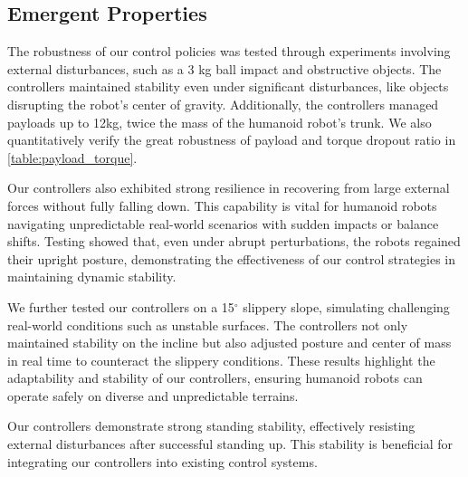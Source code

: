 \subsection{Emergent Properties} 


 The robustness of our control policies was tested through experiments involving external disturbances, such as a 3 kg ball impact and obstructive objects. The controllers maintained stability even under significant disturbances, like objects disrupting the robot's center of gravity. Additionally, the controllers managed payloads up to 12kg, twice the mass of the humanoid robot's trunk. We also quantitatively verify the great robustness of payload and torque dropout ratio in \cref{table:payload_torque}.  

 Our controllers also exhibited strong resilience in recovering from large external forces without fully falling down. This capability is vital for humanoid robots navigating unpredictable real-world scenarios with sudden impacts or balance shifts. Testing showed that, even under abrupt perturbations, the robots regained their upright posture, demonstrating the effectiveness of our control strategies in maintaining dynamic stability.

 We further tested our controllers on a 15$^\circ$ slippery slope, simulating challenging real-world conditions such as unstable surfaces. The controllers not only maintained stability on the incline but also adjusted posture and center of mass in real time to counteract the slippery conditions. These results highlight the adaptability and stability of our controllers, ensuring humanoid robots can operate safely on diverse and unpredictable terrains.

 Our controllers demonstrate strong standing stability, effectively resisting external disturbances after successful standing up. This stability is beneficial for integrating our controllers into existing control systems.

